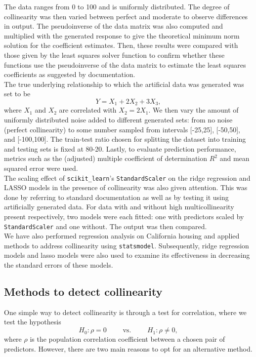 \documentclass[12pt]{article}
\begin{document}
	The data ranges from 0 to 100 and is uniformly distributed. The degree of collinearity was then varied between perfect and moderate to observe differences in output. The pseudoinverse of the data matrix was also computed and multiplied with the generated response to give the theoretical minimum norm solution for the coefficient estimates. Then, these results were compared with those given by the least squares solver function to confirm whether these functions use the pseudoinverse of the data matrix to estimate the least squares coefficients as suggested by documentation.\\
	
	The true underlying relationship to which the artificial data was generated was set to be 
	$$Y=X_1+2X_2+3X_3,$$
	where $X_1$ and $X_2$ are correlated with $X_2=2X_1$. We then vary the amount of uniformly distributed noise added to different generated sets: from no noise (perfect collinearity) to some number sampled from intervals [-25,25], [-50,50], and [-100,100]. The train-test ratio chosen for splitting the dataset into training and testing sets is fixed at 80-20. Lastly, to evaluate prediction performance, metrics such as the (adjusted) multiple coefficient of determination $R^2$ and mean squared error were used.\\
	
	The scaling effect of \texttt{scikit\_learn}'s \texttt{StandardScaler} on the ridge regression and LASSO models in the presence of collinearity was also given attention. This was done by referring to standard documentation as well as by testing it using artificially generated data. For data with and without high multicollinearity present respectively, two models were each fitted: one with predictors scaled by \texttt{StandardScaler} and one without. The output was then compared. \\
	
	We have also performed regression analysis on California housing and applied methods to address collinearity using \texttt{statsmodel}. Subsequently, ridge regression models and lasso models were also used to examine its effectiveness in decreasing the standard errors of these models.
	
	\subsection{Methods to detect collinearity}
	
	One simple way to detect collinearity is through a test for correlation, where we test the hypothesis
	$$H_0: \rho=0 \quad\quad\text{ vs. }\quad\quad H_1: \rho\neq 0,$$
	where $\rho$ is the population correlation coefficient between a chosen pair of predictors. However, there are two main reasons to opt for an alternative method.
	
\end{document}
